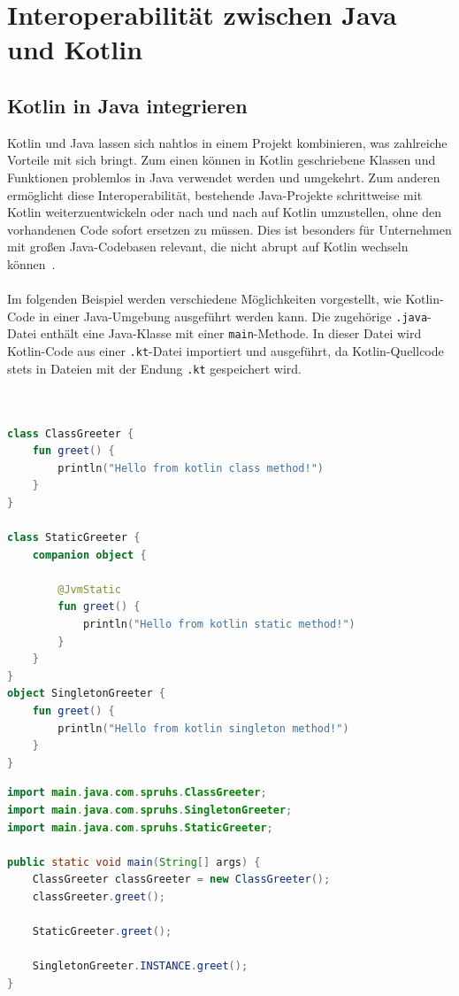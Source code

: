 \documentclass[11pt]{article}
\begin{document}
    \section{Interoperabilität zwischen Java und Kotlin}

    \subsection{Kotlin in Java integrieren}
    Kotlin und Java lassen sich nahtlos in einem Projekt kombinieren, was zahlreiche Vorteile mit sich bringt.
    Zum einen können in Kotlin geschriebene Klassen und Funktionen problemlos in Java verwendet werden und umgekehrt.
    Zum anderen ermöglicht diese Interoperabilität, bestehende Java-Projekte schrittweise mit Kotlin weiterzuentwickeln oder nach und nach auf Kotlin umzustellen, ohne den vorhandenen Code sofort ersetzen zu müssen.
    Dies ist besonders für Unternehmen mit großen Java-Codebasen relevant, die nicht abrupt auf Kotlin wechseln können~\cite[20]{kotlin-handbuch}.\\
    \\
    Im folgenden Beispiel werden verschiedene Möglichkeiten vorgestellt, wie Kotlin-Code in einer Java-Umgebung ausgeführt werden kann.
    Die zugehörige \texttt{.java}-Datei enthält eine Java-Klasse mit einer \texttt{main}-Methode.
    In dieser Datei wird Kotlin-Code aus einer \texttt{.kt}-Datei importiert und ausgeführt, da Kotlin-Quellcode stets
    in Dateien mit der Endung \texttt{.kt} gespeichert wird.\\
    \\

    \begin{lstlisting}[language=Kotlin, caption={KotlinGreeter.kt}]

class ClassGreeter {
    fun greet() {
        println("Hello from kotlin class method!")
    }
}

class StaticGreeter {
    companion object {

        @JvmStatic
        fun greet() {
            println("Hello from kotlin static method!")
        }
    }
}
object SingletonGreeter {
    fun greet() {
        println("Hello from kotlin singleton method!")
    }
}
    \end{lstlisting}

    \begin{lstlisting}[language=Java, caption={Main.java}]
import main.java.com.spruhs.ClassGreeter;
import main.java.com.spruhs.SingletonGreeter;
import main.java.com.spruhs.StaticGreeter;

public static void main(String[] args) {
    ClassGreeter classGreeter = new ClassGreeter();
    classGreeter.greet();

    StaticGreeter.greet();

    SingletonGreeter.INSTANCE.greet();
}
    \end{lstlisting}
\end{document}
